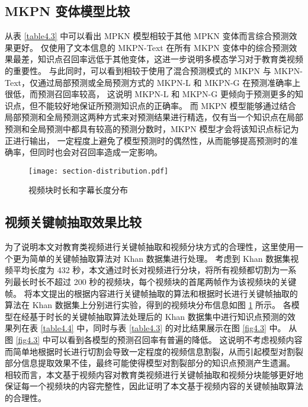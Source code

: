     \subsection{MKPN 变体模型比较}
    从表 \ref{table4.3} 中可以看出 MPKN 模型相较于其他 MPKN 变体而言综合预测效果更好。
    仅使用了文本信息的 MKPN-Text 在所有 MKPN 变体中的综合预测效果最差，知识点召回率远低于其他变体，这进一步说明多模态学习对于教育类视频的重要性。
    与此同时，可以看到相较于使用了混合预测模式的 MKPN 与 MKPN-Text，仅通过局部预测或全局预测方式的 MKPN-L 和 MKPN-G 在预测准确率上很低，而预测召回率较高，
    这说明 MKPN-L 和 MKPN-G 更倾向于预测更多的知识点，但不能较好地保证所预测知识点的正确率。
    而 MKPN 模型能够通过结合局部预测和全局预测这两种方式来对预测结果进行精选，仅有当一个知识点在局部预测和全局预测中都具有较高的预测分数时，MKPN 模型才会将该知识点标记为正进行输出，
    一定程度上避免了模型预测时的偶然性，从而能够提高预测时的准确率，但同时也会对召回率造成一定影响。

    \begin{figure}[htb]
        \centering
        \texttt{[image: section-distribution.pdf]}
        \caption{视频块时长和字幕长度分布}
        \label{fig4.2}
    \end{figure}

    \subsection{视频关键帧抽取效果比较}
    为了说明本文对教育类视频进行关键帧抽取和视频分块方式的合理性，这里使用一个更为简单的关键帧抽取算法对 Khan 数据集进行处理。
    考虑到 Khan 数据集视频平均长度为 432 秒，本文通过时长对视频进行分块，将所有视频都切割为一系列最长时长不超过 200 秒的视频块，每个视频块的首尾两帧作为该视频块的关键帧。
    将本文提出的根据内容进行关键帧抽取的算法和根据时长进行关键帧抽取的算法在 Khan 数据集上分别进行实验，得到的视频块分布信息如图 \ref{fig4.2} 所示。
    各模型在经基于时长的关键帧抽取算法处理后的 Khan 数据集中进行知识点预测的效果列在表 \ref{table4.4} 中，同时与表 \ref{table4.3} 的对比结果展示在图 \ref{fig4.3} 中。
    从图 \ref{fig4.3} 中可以看到各模型的预测召回率有普遍的降低。
    这说明不考虑视频内容而简单地根据时长进行切割会导致一定程度的视频信息割裂，从而引起模型对割裂部分信息提取效果不佳，最终可能使得模型对割裂部分的知识点预测产生遗漏。
    相较而言，本文基于视频内容对教育类视频进行关键帧抽取和视频分块能够更好地保证每一个视频块的内容完整性，因此证明了本文基于视频内容的关键帧抽取算法的合理性。

